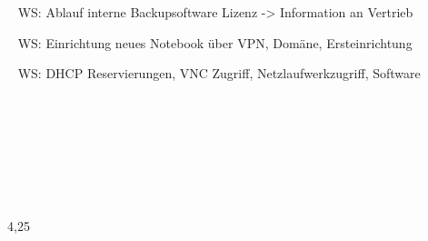 {{	\textbullet~ WS: Ablauf interne Backupsoftware Lizenz -> Information an Vertrieb\par
	\textbullet~ WS: Einrichtung neues Notebook über VPN, Domäne, Ersteinrichtung\par
	\textbullet~ WS: DHCP Reservierungen, VNC Zugriff, Netzlaufwerkzugriff, Software\par
	\textbullet~ \par
	\textbullet~ \par
	\textbullet~ \par
	\textbullet~ 
	}{}{4,25}
}{}
\Unterschrift
\newpage
